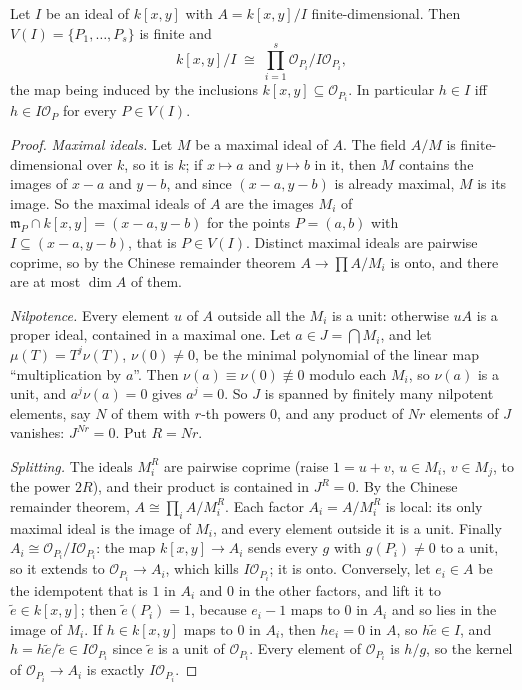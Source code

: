 \begin{lemma}\label{lem:localdecomp}
Let $I$ be an ideal of $k[x,y]$ with $A=k[x,y]/I$ finite-dimensional. Then $V(I)=\{P_1,\dots,P_s\}$ is finite and
\[
k[x,y]/I\;\cong\;\prod_{i=1}^s\mathcal O_{P_i}/I\mathcal O_{P_i},
\]
the map being induced by the inclusions $k[x,y]\subseteq\mathcal O_{P_i}$. In particular $h\in I$ iff $h\in I\mathcal O_P$ for every $P\in V(I)$.
\end{lemma}
\begin{proof}
\emph{Maximal ideals.} Let $M$ be a maximal ideal of $A$. The field $A/M$ is finite-dimensional over $k$, so it is $k$; if $x\mapsto a$ and $y\mapsto b$
in it, then $M$ contains the images of $x-a$ and $y-b$, and since $(x-a,y-b)$ is already maximal, $M$ is its image. So the maximal ideals of $A$
are the images $M_i$ of $\mathfrak m_{P}\cap k[x,y]=(x-a,y-b)$ for the points $P=(a,b)$ with $I\subseteq(x-a,y-b)$, that is $P\in V(I)$. Distinct
maximal ideals are pairwise coprime, so by the Chinese remainder theorem $A\to\prod A/M_i$ is onto, and there are at most $\dim A$ of them.

\emph{Nilpotence.} Every element $u$ of $A$ outside all the $M_i$ is a unit: otherwise $uA$ is a proper ideal, contained in a maximal one. Let
$a\in J=\bigcap M_i$, and let $\mu(T)=T^j\nu(T)$, $\nu(0)\ne0$, be the minimal polynomial of the linear map ``multiplication by $a$''. Then
$\nu(a)\equiv\nu(0)\not\equiv0$ modulo each $M_i$, so $\nu(a)$ is a unit, and $a^j\nu(a)=0$ gives $a^j=0$. So $J$ is spanned by finitely many
nilpotent elements, say $N$ of them with $r$-th powers $0$, and any product of $Nr$ elements of $J$ vanishes: $J^{Nr}=0$. Put $R=Nr$.

\emph{Splitting.} The ideals $M_i^R$ are pairwise coprime (raise $1=u+v$, $u\in M_i$, $v\in M_j$, to the power $2R$), and their product is contained
in $J^R=0$. By the Chinese remainder theorem, $A\cong\prod_iA/M_i^R$. Each factor $A_i=A/M_i^R$ is local: its only maximal ideal is the image of
$M_i$, and every element outside it is a unit. Finally $A_i\cong\mathcal O_{P_i}/I\mathcal O_{P_i}$: the map $k[x,y]\to A_i$ sends every
$g$ with $g(P_i)\ne0$ to a unit, so it extends to $\mathcal O_{P_i}\to A_i$, which kills $I\mathcal O_{P_i}$; it is onto. Conversely, let
$e_i\in A$ be the idempotent that is $1$ in $A_i$ and $0$ in the other factors, and lift it to $\tilde e\in k[x,y]$; then $\tilde e(P_i)=1$, because $e_i-1$ maps to $0$ in $A_i$ and so lies in the image of $M_i$. If $h\in k[x,y]$ maps to $0$ in $A_i$, then $he_i=0$ in $A$, so $h\tilde e\in I$, and
$h=h\tilde e/\tilde e\in I\mathcal O_{P_i}$ since $\tilde e$ is a unit of $\mathcal O_{P_i}$. Every element of $\mathcal O_{P_i}$ is $h/g$, so
the kernel of $\mathcal O_{P_i}\to A_i$ is exactly $I\mathcal O_{P_i}$.
\end{proof}

